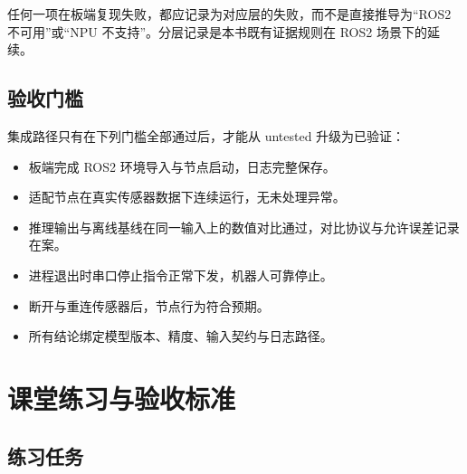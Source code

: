 任何一项在板端复现失败，都应记录为对应层的失败，而不是直接推导为``ROS2
不可用''或``NPU 不支持''。分层记录是本书既有证据规则在 ROS2
场景下的延续。

\subsection{验收门槛}\label{ux9a8cux6536ux95e8ux69db}

集成路径只有在下列门槛全部通过后，才能从 untested 升级为已验证：

\begin{itemize}
\tightlist
\item
  板端完成 ROS2 环境导入与节点启动，日志完整保存。
\item
  适配节点在真实传感器数据下连续运行，无未处理异常。
\item
  推理输出与离线基线在同一输入上的数值对比通过，对比协议与允许误差记录在案。
\item
  进程退出时串口停止指令正常下发，机器人可靠停止。
\item
  断开与重连传感器后，节点行为符合预期。
\item
  所有结论绑定模型版本、精度、输入契约与日志路径。
\end{itemize}

\section{课堂练习与验收标准}\label{ux8bfeux5802ux7ec3ux4e60ux4e0eux9a8cux6536ux6807ux51c6}

\subsection{练习任务}\label{ux7ec3ux4e60ux4efbux52a1}

